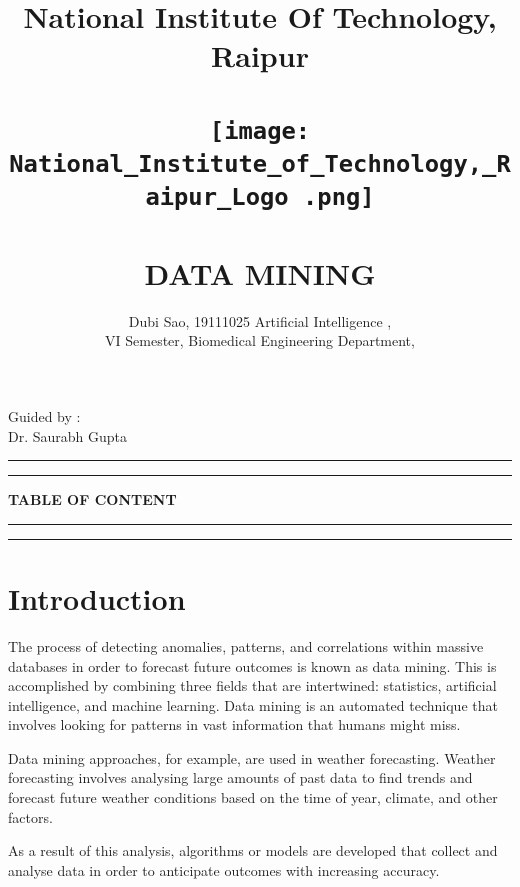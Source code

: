 \documentclass[12pt,letterpaper]{article}
\begin{document}
\title{
\textbf{National Institute Of Technology, Raipur\\ 
 \\ \texttt{[image: National\_Institute\_of\_Technology,\_Raipur\_Logo .png]}
\\ \\
DATA MINING}
}

\author{Dubi Sao, 19111025 
Artificial Intelligence ,\\ VI Semester,
        Biomedical Engineering Department,\\
        }
\date{}
\maketitle
\begin{flushright}
    Guided by :\\
    Dr. Saurabh Gupta
\end{flushright}
\rule{\textwidth}{1pt}
\begin{abstract}



\end{abstract}
\rule{\textwidth}{1pt}
\newpage
\textbf{TABLE OF CONTENT}\\
\rule{\textwidth}{1pt}
\tableofcontents
\rule{\textwidth}{1pt}

\section{Introduction}
The process of detecting anomalies, patterns, and correlations within massive databases in order to forecast future outcomes is known as data mining. This is accomplished by combining three fields that are intertwined: statistics, artificial intelligence, and machine learning. Data mining is an automated technique that involves looking for patterns in vast information that humans might miss.


Data mining approaches, for example, are used in weather forecasting. Weather forecasting involves analysing large amounts of past data to find trends and forecast future weather conditions based on the time of year, climate, and other factors.



As a result of this analysis, algorithms or models are developed that collect and analyse data in order to anticipate outcomes with increasing accuracy.
\end{document}
